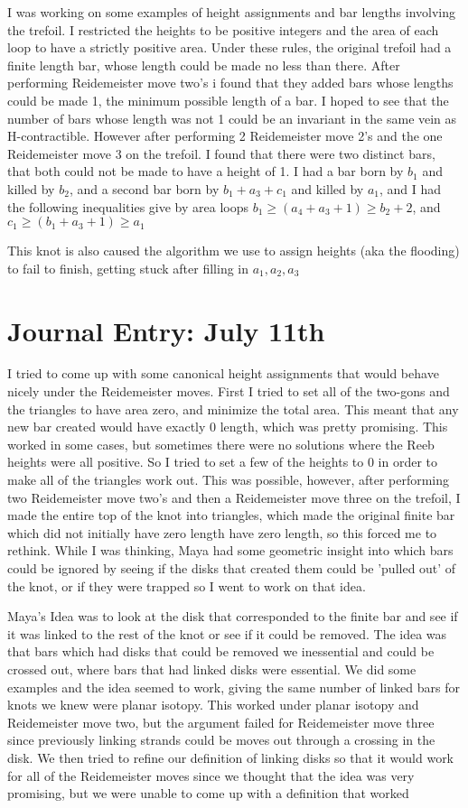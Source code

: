 \documentclass[11pt,oneside]{amsart}
\begin{document}
I was working on some examples of height assignments and bar lengths involving the trefoil. I restricted the heights to be positive integers and the area of each loop to have a strictly positive area. Under these rules, the original trefoil had a finite length bar, whose length could be made no less than there. After performing Reidemeister move two's i found that they added bars whose lengths could be made 1, the minimum possible length of a bar. I hoped to see that the number of bars whose length was not 1 could be an invariant in the same vein as H-contractible. However after performing 2 Reidemeister move 2's and the one Reidemeister move 3 on the trefoil. I found that there were two distinct bars, that both could not be made to have a height of 1.
I had a bar born by $b_1$ and killed by $b_2$, and a second bar born by $b_1 + a_3 + c_1$ and killed by $a_1$, and I had the following inequalities give by area loops
$b_1 \geq (a_4 + a_3 + 1) \geq b_2 + 2$, and $c_1 \geq (b_1 + a_3 + 1) \geq a_1$

This knot is also caused the algorithm we use to assign heights (aka the flooding) to fail to finish, getting stuck after filling in $a_1, a_2, a_3$

\section{Journal Entry: July 11th}

I tried to come up with some canonical height assignments that would behave nicely under the Reidemeister moves. First I tried to set all of the two-gons and the triangles to have area zero, and minimize the total area. This meant that any new bar created would have exactly 0 length, which was pretty promising. This worked in some cases, but sometimes there were no solutions where the Reeb heights were all positive. So I tried to set a few of the heights to 0 in order to make all of the triangles work out. This was possible, however, after performing two Reidemeister move two's and then a Reidemeister move three on the trefoil, I made the entire top of the knot into triangles, which made the original finite bar which did not initially have zero length have zero length, so this forced me to rethink. While I was thinking, Maya had  some geometric insight into which bars could be ignored by seeing if the disks that created them could be 'pulled out' of the knot, or if they were trapped so I went to work on that idea.

Maya's Idea was to look at the disk that corresponded to the finite bar and see if it was linked to the rest of the knot or see if it could  be removed. The idea was that bars which had disks that could be removed we inessential and could be crossed out, where bars that had linked disks were essential. We did some examples and the idea seemed to work, giving the same number of linked bars for knots we knew were planar isotopy. This worked under planar isotopy and Reidemeister move two, but the argument failed for Reidemeister move three since previously linking strands could be moves out through a crossing in the disk. We then tried to refine our definition of linking disks so that it would work for all of the Reidemeister moves since we thought that the idea was very promising, but we were unable to come up with a definition that worked
\end{document}
